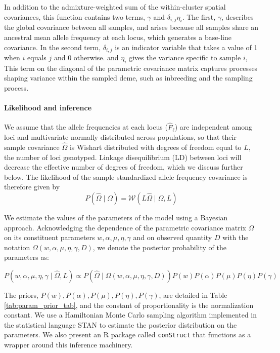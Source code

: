 \documentclass[12pt]{article}
\begin{document}
In addition to the admixture-weighted sum of the within-cluster spatial covariances,
this function contains two terms, $\gamma$ and $\delta_{i,j}\eta_i$.
The first, $\gamma$, describes the global covariance between all samples, 
and arises because all samples share an ancestral mean allele frequency at each locus,
which generates a base-line covariance.
In the second term, $\delta_{i,j}$ is an indicator variable that takes a value of 1 when $i$ equals $j$ and 0 otherwise. 
and $\eta_i$ gives the variance specific to sample $i$, 
This term on the diagonal of the parametric covariance matrix captures processes shaping variance within the sampled deme, 
such as inbreeding and the sampling process.

\paragraph{Likelihood and inference}
We assume that the allele frequencies at each locus ($\widehat{F}_{\ell}$) 
are independent among loci and multivariate normally distributed across populations, 
so that their sample covariance $\widehat{\Omega}$ 
is  Wishart distributed with degrees of freedom equal to $L$, 
the number of loci genotyped.
Linkage disequilibrium (LD) between loci will decrease the effective number of degrees of freedom, 
which we discuss further below.
The likelihood of the sample standardized allele frequency covariance is therefore given by
\begin{equation}
P(\widehat{\Omega} \; | \; \Omega) = \mathcal{W} \left( L\widehat{\Omega} \; | \; \Omega,L\right)
\end{equation}

We estimate the values of the parameters of the model using a Bayesian approach.
Acknowledging the dependence of the parametric covariance matrix $\Omega$ on its constituent parameters
$w,\alpha,\mu,\eta,\gamma$ and on observed quantity $D$ 
with the notation $\Omega(w,\alpha,\mu,\eta,\gamma,D)$,
we denote the posterior probability of the parameters as:

\begin{equation}
P\left( w,\alpha,\mu,\eta,\gamma \;	| \; \widehat{\Omega}, L \right) \propto
P\left(\widehat{\Omega} \; | \; \Omega(w,\alpha,\mu,\eta,\gamma,D) \right)
P(w)P(\alpha)P(\mu)P(\eta)P(\gamma)
\end{equation}

The priors, $P(w),P(\alpha),P(\mu),P(\eta),P(\gamma)$, are detailed in Table \ref{tab:param_prior_tab},
and the constant of proportionality is the normalization constant.
We use a Hamiltonian Monte Carlo sampling algorithm implemented in the statistical language STAN
\citep{stan, NUTS, stan_lib, rstan} to estimate the posterior distribution on the parameters.
We also present an R package \citep{R} called \texttt{conStruct} that functions as a wrapper 
around this inference machinery.
\end{document}
